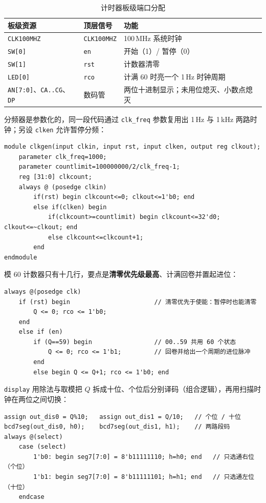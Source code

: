 \documentclass[12pt, a4paper]{ctexart}
\begin{document}
\begin{table}[htbp]
    \centering
    \caption{计时器板级端口分配}
    \label{tab:timer-io}
    \begin{tabular}{lll}
        \hline
        板级资源 & 顶层信号 & 功能 \\
        \hline
        \texttt{CLK100MHZ} & \texttt{CLK100MHZ} & 100\,MHz 系统时钟 \\
        \texttt{SW[0]} & \texttt{en}  & 开始（1）/ 暂停（0）\\
        \texttt{SW[1]} & \texttt{rst} & 计数器清零 \\
        \texttt{LED[0]} & \texttt{rco} & 计满 60 时亮一个 1\,Hz 时钟周期 \\
        \texttt{AN[7:0]}、\texttt{CA..CG}、\texttt{DP} & 数码管 & 两位十进制显示；未用位熄灭、小数点熄灭 \\
        \hline
    \end{tabular}
\end{table}

分频器是参数化的，同一段代码通过 \texttt{clk\_freq} 参数复用出 1\,Hz 与 1\,kHz 两路时钟；另设 \texttt{clken} 允许暂停分频：

\begin{lstlisting}
module clkgen(input clkin, input rst, input clken, output reg clkout);
    parameter clk_freq=1000;
    parameter countlimit=100000000/2/clk_freq-1;
    reg [31:0] clkcount;
    always @ (posedge clkin)
        if(rst) begin clkcount<=0; clkout<=1'b0; end
        else if(clken) begin
            if(clkcount>=countlimit) begin clkcount<=32'd0; clkout<=~clkout; end
            else clkcount<=clkcount+1;
        end
endmodule
\end{lstlisting}

模 60 计数器只有十几行，要点是\textbf{清零优先级最高}、计满回卷并置起进位：

\begin{lstlisting}
always @(posedge clk)
    if (rst) begin                       // 清零优先于使能：暂停时也能清零
        Q <= 0; rco <= 1'b0;
    end
    else if (en)
        if (Q==59) begin                 // 00..59 共用 60 个状态
            Q <= 0; rco <= 1'b1;         // 回卷并给出一个周期的进位脉冲
        end
        else begin Q <= Q+1; rco <= 1'b0; end
\end{lstlisting}

\texttt{display} 用除法与取模把 $Q$ 拆成十位、个位后分别译码（组合逻辑），再用扫描时钟在两位之间切换：

\begin{lstlisting}
assign out_dis0 = Q%10;   assign out_dis1 = Q/10;   // 个位 / 十位
bcd7seg(out_dis0, h0);    bcd7seg(out_dis1, h1);    // 两路段码
always @(select)
    case (select)
        1'b0: begin seg7[7:0] = 8'b11111110; h=h0; end   // 只选通右位（个位）
        1'b1: begin seg7[7:0] = 8'b11111101; h=h1; end   // 只选通左位（十位）
    endcase
\end{lstlisting}
\end{document}
